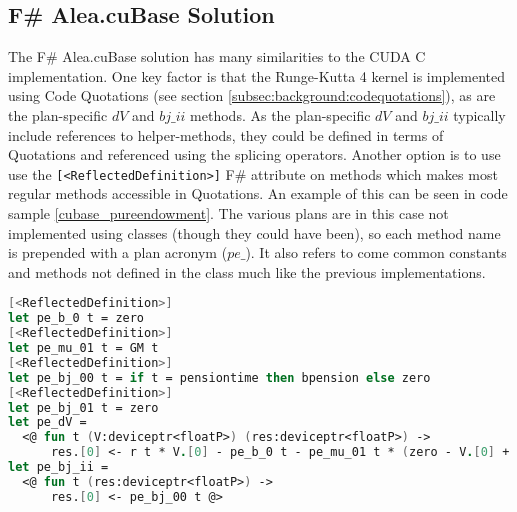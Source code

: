 \subsection{F\# Alea.cuBase Solution}
The F\# Alea.cuBase solution has many similarities to the CUDA C implementation.
One key factor is that the Runge-Kutta 4 kernel is implemented using Code Quotations (see section \ref{subsec:background:codequotations}), as are the plan-specific $dV$ and $bj\_ii$ methods.
As the plan-specific $dV$ and $bj\_ii$ typically include references to helper-methods, they could be defined in terms of Quotations and referenced using the splicing operators.
Another option is to use use the \lstinline$[<ReflectedDefinition>]$ F\# attribute on methods which makes most regular methods accessible in Quotations.
An example of this can be seen in code sample \ref{cubase_pureendowment}. 
The various plans are in this case not implemented using classes (though they could have been), so each method name is prepended with a plan acronym ($pe\_$).
It also refers to come common constants and methods not defined in the class much like the previous implementations.
\clearpage
\begin{lstlisting}[language=FSharp, caption=The pure endowment insurance plan expressed in F\# Alea.cuBase, label=cubase_pureendowment]
[<ReflectedDefinition>] 
let pe_b_0 t = zero
[<ReflectedDefinition>]
let pe_mu_01 t = GM t
[<ReflectedDefinition>]
let pe_bj_00 t = if t = pensiontime then bpension else zero
[<ReflectedDefinition>]
let pe_bj_01 t = zero
let pe_dV = 
  <@ fun t (V:deviceptr<floatP>) (res:deviceptr<floatP>) -> 
      res.[0] <- r t * V.[0] - pe_b_0 t - pe_mu_01 t * (zero - V.[0] + pe_bj_01 t) @>
let pe_bj_ii = 
  <@ fun t (res:deviceptr<floatP>) ->
      res.[0] <- pe_bj_00 t @>
\end{lstlisting}

